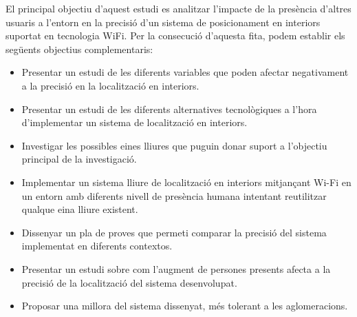 
El principal objectiu d'aquest estudi es analitzar l'impacte de la presència d'altres usuaris a l'entorn en la precisió d'un sistema de posicionament en interiors suportat en tecnologia WiFi. Per la consecució d'aquesta fita, podem establir els següents objectius complementaris:

\begin{itemize}
    \item Presentar un estudi de les diferents variables que poden afectar negativament a la precisió en la localització en interiors.
    \item Presentar un estudi de les diferents alternatives tecnològiques a l'hora d'implementar un sistema de localització en interiors.
    \item Investigar les possibles eines lliures que puguin donar suport a l'objectiu principal de la investigació.
    \item Implementar un sistema lliure de localització en interiors mitjançant Wi-Fi en un entorn amb diferents nivell de presència humana intentant reutilitzar qualque eina lliure existent.
    \item Dissenyar un pla de proves que permeti comparar la precisió del sistema implementat en diferents contextos.
    \item Presentar un estudi sobre com l’augment de persones presents afecta a la precisió de la localització del sistema desenvolupat.
    \item Proposar una millora del sistema dissenyat, més tolerant a les aglomeracions.
\end{itemize}
